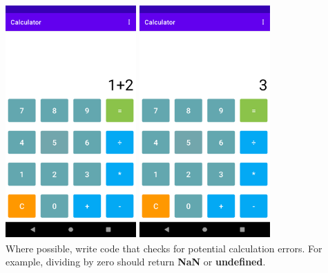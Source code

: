 \documentclass{article}
\begin{document}
\includegraphics[width=5cm, height=9cm]{../tex/img/03-events/practical/calculator-1.png}
\includegraphics[width=5cm, height=9cm]{../tex/img/03-events/practical/calculator-2.png} \\

Where possible, write code that checks for potential calculation errors. For example, dividing by zero should return \textbf{NaN} or \textbf{undefined}. \\
\end{document}
